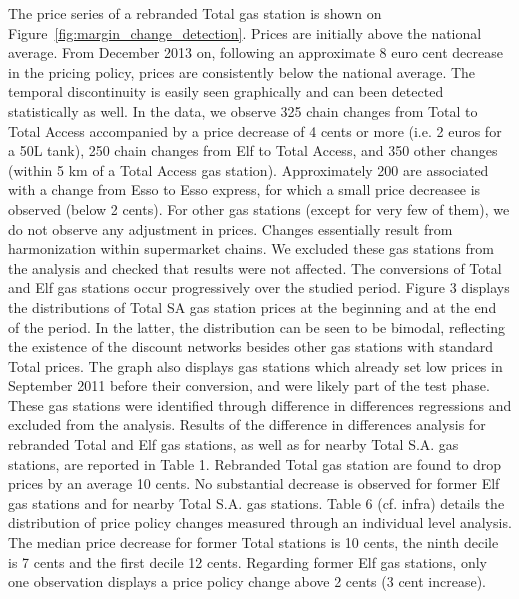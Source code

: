 \documentclass[english]{article}
\begin{document}
The price series of a rebranded Total gas station is shown on Figure~\ref{fig:margin_change_detection}. Prices are initially above the national average. From December 2013 on, following an approximate 8 euro cent decrease in the pricing policy, prices are consistently below the national average. The temporal discontinuity is easily seen graphically and can been detected statistically as well. In the data, we observe 325 chain changes from Total to Total Access accompanied by a price decrease of 4 cents or more (i.e. 2 euros for a 50L tank), 250 chain changes from Elf to Total Access, and 350 other changes (within 5 km of a Total Access gas station). Approximately 200  are associated with a change from Esso to Esso express, for which a small price decreasee is observed (below 2 cents). For other gas
stations (except for very few of them), we do not observe any adjustment in prices. Changes essentially result from harmonization within supermarket chains. We excluded these gas stations from the analysis and checked that results were not affected. The conversions of Total and Elf gas stations occur progressively over the studied period. Figure 3 displays the distributions of Total SA gas station prices at the beginning and at the end of the period. In the latter, the distribution can be seen to be bimodal, reflecting the existence of the discount networks besides other gas stations with standard Total prices. The graph also displays gas stations which already set low prices in September 2011 before their conversion, and were likely part of the test phase. These gas stations were identified through difference in differences regressions and excluded from the analysis. Results of the difference in differences analysis for rebranded Total
and Elf gas stations, as well as for nearby Total S.A. gas stations, are reported in Table 1. Rebranded Total gas station are found to drop prices by an average 10 cents. No substantial decrease is observed for former Elf gas stations and for nearby Total S.A. gas
stations. Table 6 (cf. infra) details the distribution of price policy changes measured through an individual level analysis. The median price decrease for former Total stations is 10 cents, the ninth decile is 7 cents and the first decile 12 cents. Regarding former Elf gas stations, only one observation displays a price policy change above 2 cents (3 cent increase).
\end{document}
